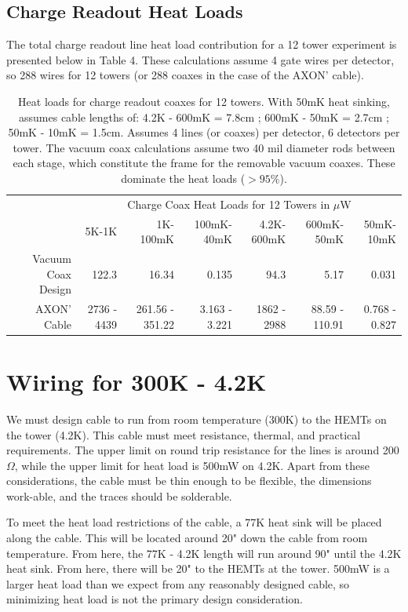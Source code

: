 \documentclass{report}
\begin{document}
\subsection{Charge Readout Heat Loads}

The total charge readout line heat load contribution for a 12 tower experiment is presented below in Table 4. These calculations assume 4 gate wires per detector, so 288 wires for 12 towers (or 288 coaxes in the case of the AXON' cable).

\begin{table}[h]
\begin{threeparttable}
\begin{tabular}{rrrr|rrr}
\toprule
 & \multicolumn{6}{c}{Charge Coax Heat Loads for 12 Towers in $\mu$W} \\
  & 5K-1K & 1K-100mK & 100mK-40mK & 4.2K-600mK & 600mK-50mK & 50mK-10mK \\
 \cmidrule(r){2-7}
   Vacuum Coax Design & 122.3 & 16.34 & 0.135 & 94.3 & 5.17 & 0.031 \\
   AXON' Cable & 2736 - 4439 & 261.56 - 351.22 & 3.163 - 3.221 & 1862 - 2988 & 88.59 - 110.91 & 0.768 - 0.827 \\
  \bottomrule
\end{tabular}
\end{threeparttable}
\caption{Heat loads for charge readout coaxes for 12 towers. With 50mK heat sinking, assumes cable lengths of: 4.2K - 600mK = 7.8cm ; 600mK - 50mK = 2.7cm ; 50mK - 10mK = 1.5cm. Assumes 4 lines (or coaxes) per detector, 6 detectors per tower. The vacuum coax calculations assume two 40 mil diameter rods between each stage, which constitute the frame for the removable vacuum coaxes. These dominate the heat loads ($>95\%$).}
\end{table}

\section{Wiring for 300K - 4.2K}

We must design cable to run from room temperature (300K) to the HEMTs on the tower (4.2K). This cable must meet resistance, thermal, and practical requirements. The upper limit on round trip resistance for the lines is around 200$\Omega$, while the upper limit for heat load is 500mW on 4.2K. Apart from these considerations, the cable must be thin enough to be flexible, the dimensions work-able, and the traces should be solderable\footnotemark.

To meet the heat load restrictions of the cable, a 77K heat sink will be placed along the cable. This will be located around 20" down the cable from room temperature. From here, the 77K - 4.2K length will run around 90" until the 4.2K heat sink. From here, there will be 20" to the HEMTs at the tower. 500mW is a larger heat load than we expect from any reasonably designed cable, so minimizing heat load is not the primary design consideration.
\end{document}
